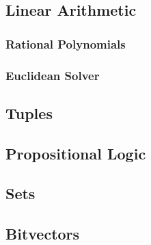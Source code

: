 \documentclass[12pt]{article}
\begin{document}
 \subsection{Linear Arithmetic}\label{subsec:arithmetic}

    

    

  \subsubsection{Rational Polynomials}\label{subsec:bdd}

    

    

    \subsubsection{Euclidean Solver}\label{subsec:euclid}

    

    


 \subsection{Tuples}\label{subsec:tuples}

   

   


 \subsection{Propositional Logic}\label{subsec:propositional}

 

 


 \subsection{Sets}\label{subsec:sets}

 

 


 \subsection{Bitvectors}\label{subsec:bv}
\end{document}
